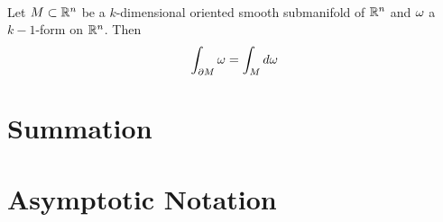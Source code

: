\documentclass{book}
\begin{document}
	\begin{ex}
		
	\end{ex}

	\begin{thm}\\
		Let $M \subset \mathbb{R}^n$ be a $k$-dimensional oriented smooth submanifold of $\mathbb{R}^n$ and $\omega$ a $k-1$-form on $\mathbb{R}^n$. Then $$\int_{\partial M} \omega = \int_M d \omega$$
	\end{thm}



	

\backmatter 



\appendix

\chapter{Summation}


\newpage	

\chapter{Asymptotic Notation}
























%	
%	
%	
%	
%	
%	
\end{document}
